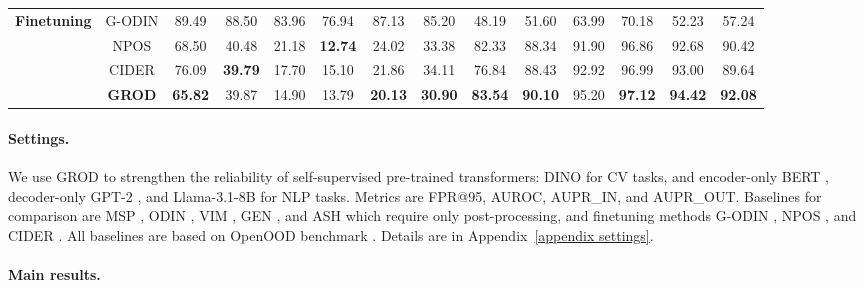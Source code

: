 \documentclass{article}
\theoremstyle{plain}
\theoremstyle{definition}
\theoremstyle{remark}
\begin{document}
\begin{table}[!t]
{\begin{tabular}{cccccccccccccc}
\textbf{Finetuning} & \textsc{G-ODIN} &
89.49 & 88.50 & 83.96 & 76.94 & 87.13 & 85.20 &
48.19 & 51.60 & 63.99 & 70.18 & 52.23 & 57.24 \\
 & \textsc{NPOS} &
68.50 & 40.48 & 21.18 & \textbf{12.74} & 24.02 & 33.38 &
82.33 & 88.34 & 91.90 & 96.86 & 92.68 & 90.42 \\
 & \textsc{CIDER} &
76.09 & \textbf{39.79} & 17.70 & 15.10 & 21.86 & 34.11 &
76.84 & 88.43 & 92.92 & 96.99 & 93.00 & 89.64 \\
\rowcolor{gray!10} & \textsc{\textbf{GROD}} &

\textbf{65.82} & 39.87 & 14.90 & 13.79 & \textbf{20.13} & \textbf{30.90} &
\textbf{83.54} & \textbf{90.10} & 95.20 & \textbf{97.12} & \textbf{94.42} & \textbf{92.08} \\
\midrule

\end{tabular}
}
\vspace{-0.5em}
\end{table}


\paragraph{Settings.}

We use \textsc{GROD} to strengthen the reliability of self-supervised pre-trained transformers: DINO \citep{caron2021emerging} for CV tasks, and encoder-only BERT \citep{devlin2018bert}, decoder-only GPT-2 \citep{radford2019language}, and Llama-3.1-8B for NLP tasks.
Metrics are FPR@95, AUROC, AUPR\_IN, and AUPR\_OUT. 
%
Baselines for comparison are \textsc{MSP} \citep{hendrycks2016baseline}, \textsc{ODIN} \citep{liang2017enhancing}, \textsc{VIM} \citep{wang2022vim}, \textsc{GEN} \citep{liu2023gen}, and \textsc{ASH} \citep{djurisic2022extremely} which require only post-processing, and finetuning methods \textsc{G-ODIN} \citep{hsu2020generalized}, \textsc{NPOS} \citep{tao2023non}, and \textsc{CIDER} \citep{ming2022exploit}. All baselines are based on OpenOOD benchmark \citep{zhang2023openood,yang2022openood,yang2022fsood,yang2021generalized,bitterwolf2023or}. Details are in Appendix~\ref{appendix settings}.

\paragraph{Main results.}
\end{document}
